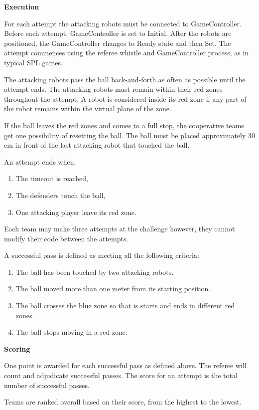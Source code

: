 {\bigskip
{\bfseries Execution}
\smallskip

For each attempt the attacking robots must be connected to GameController.
Before each attempt, GameController is set to Initial.
After the robots are positioned, the GameController changes to Ready state and then Set.
The attempt commences using the referee whistle and GameController process, as in typical SPL games.

The attacking robots pass the ball back-and-forth as often as possible until the attempt ends.
The attacking robots must remain within their red zones throughout the attempt.
A robot is considered inside its red zone if any part of the robot remains within the virtual plane of the zone.

If the ball leaves the red zones and comes to a full stop, the cooperative teams get one possibility of resetting the ball.
The ball must be placed approximately 30 cm in front of the last attacking robot that touched the ball.

An attempt ends when:
\begin{enumerate}
	\item The timeout is reached,
	\item The defenders touch the ball,
	\item One attacking player leave its red zone.
\end{enumerate}

Each team may make three attempts at the challenge however, they cannot modify their code between the attempts.

A successful pass is defined as meeting all the following criteria:
\begin{enumerate}
	\item The ball has been touched by two attacking robots.
	\item The ball moved more than one meter from its starting position.
	\item The ball crosses the blue zone so that is starts and ends in different red zones.
	\item The ball stops moving in a red zone.
\end{enumerate}

\bigskip
{\bfseries Scoring}
\smallskip

One point is awarded for each successful pass as defined above. The referee will count and adjudicate successful passes.
The score for an attempt is the total number of successful passes.

Teams are ranked overall based on their score, from the highest to the lowest.
}